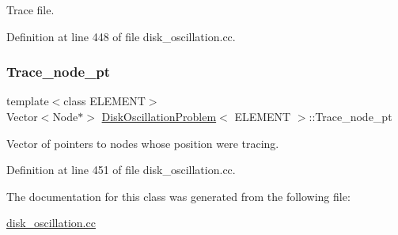 Trace file. 



Definition at line 448 of file disk\+\_\+oscillation.\+cc.

\mbox{\label{classDiskOscillationProblem_a141a79f41b33b19a6fca57793836e4da}} 
\subsubsection{\texorpdfstring{Trace\+\_\+node\+\_\+pt}{Trace\_node\_pt}}
{\footnotesize\ttfamily template$<$class E\+L\+E\+M\+E\+NT$>$ \\
Vector$<$Node$\ast$$>$ \hyperlink{classDiskOscillationProblem}{Disk\+Oscillation\+Problem}$<$ E\+L\+E\+M\+E\+NT $>$\+::Trace\+\_\+node\+\_\+pt\hspace{0.3cm}{\ttfamily [private]}}



Vector of pointers to nodes whose position we\textquotesingle{}re tracing. 



Definition at line 451 of file disk\+\_\+oscillation.\+cc.



The documentation for this class was generated from the following file\+:\begin{DoxyCompactItemize}
\item 
\hyperlink{disk__oscillation_8cc}{disk\+\_\+oscillation.\+cc}\end{DoxyCompactItemize}

